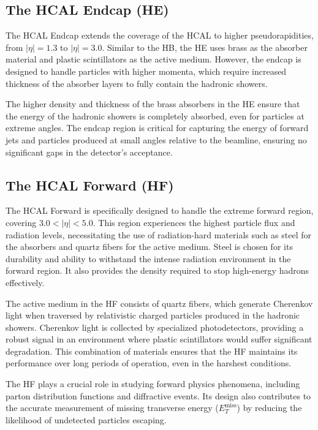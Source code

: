 \subsection{The HCAL Endcap (HE)}
The HCAL Endcap extends the coverage of the HCAL to higher pseudorapidities, from $|\eta| = 1.3$ to $|\eta| = 3.0$. Similar to the HB, the HE uses brass as the absorber material and plastic scintillators as the active medium. However, the endcap is designed to handle particles with higher momenta, which require increased thickness of the absorber layers to fully contain the hadronic showers.

The higher density and thickness of the brass absorbers in the HE ensure that the energy of the hadronic showers is completely absorbed, even for particles at extreme angles. The endcap region is critical for capturing the energy of forward jets and particles produced at small angles relative to the beamline, ensuring no significant gaps in the detector's acceptance.\cite{hcal_tdr}

\subsection{The HCAL Forward (HF)}
The HCAL Forward is specifically designed to handle the extreme forward region, covering $3.0 < |\eta| < 5.0$. This region experiences the highest particle flux and radiation levels, necessitating the use of radiation-hard materials such as steel for the absorbers and quartz fibers for the active medium. Steel is chosen for its durability and ability to withstand the intense radiation environment in the forward region. It also provides the density required to stop high-energy hadrons effectively.

The active medium in the HF consists of quartz fibers, which generate Cherenkov light when traversed by relativistic charged particles produced in the hadronic showers. Cherenkov light is collected by specialized photodetectors, providing a robust signal in an environment where plastic scintillators would suffer significant degradation. This combination of materials ensures that the HF maintains its performance over long periods of operation, even in the harshest conditions.

The HF plays a crucial role in studying forward physics phenomena, including parton distribution functions and diffractive events. Its design also contributes to the accurate measurement of missing transverse energy ($E_T^{\text{miss}}$) by reducing the likelihood of undetected particles escaping.\cite{hcal_tdr_forward}

